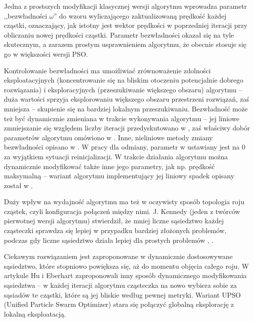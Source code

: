 \documentclass[12pt, twoside, openany, abstract=on]{report}
\theoremstyle{definition}
\begin{document}
Jedna z prostszych modyfikacji klasycznej wersji algorytmu wprowadza parametr ,,bezwładności $\omega$'' do wzoru wyliczającego zaktualizowaną prędkość każdej cząstki, oznaczający, jak istotny jest wektor prędkości w poprzedniej iteracji przy obliczaniu nowej prędkości cząstki. Parametr bezwładności okazał się na tyle skutecznym, a zarazem prostym usprawnieniem algorytmu, że obecnie stosuje się go w większości wersji PSO.

Kontrolowanie bezwładności ma umożliwiać zrównoważenie zdolności eksploatacyjnych (koncentrowanie się na bliskim otoczeniu potencjalnie dobrego rozwiązania) i eksploracyjnych (przeszukiwanie większego obszaru) algorytmu – duża wartości sprzyja eksplorowaniu większego obszaru przestrzeni rozwiązań, zaś mniejsza – skupienie się na bardziej lokalnym przeszukiwaniu. Bezwładność może też być dynamicznie zmieniana w trakcie wykonywania algorytmu – jej liniowe zmniejszanie się względem liczby iteracji przedyskutowano w \cite{ModPsoInertia}, zaś właściwy dobór parametrów algorytmu omówiono w \cite{ParamSelPso}. Inne, nieliniowe metody zmiany bezwładności opisano w \cite{PsoFuzzyInertia}. W pracy \cite{SelfOrgHPso} dla odmiany, parametr w ustawiany jest na $0$ za wyjątkiem sytuacji reinicjalizacji. W trakcie działania algorytmu można dynamicznie modyfikować także inne jego parametry, jak np. prędkość maksymalną – wariant algorytmu implementujący jej liniowy spadek opisany został w \cite{VmaxPso}.

Duży wpływ na wydajność algorytmu ma też w oczywisty sposób topologia roju cząstek, czyli konfiguracja połączeń między nimi. J. Kennedy (jeden z twórców pierwotnej wersji algorytmu) stwierdził, że mniej liczne sąsiedztwo każdej cząsteczki sprawdza się lepiej w przypadku bardziej złożonych problemów, podczas gdy liczne sąsiedztwo działa lepiej dla prostych problemów \cite{TopologyPso}, \cite{PopStructPso}. 

Ciekawym rozwiązaniem jest zaproponowane w \cite{PsoNeighOp} dynamicznie dostosowywane sąsiedztwo, które stopniowo powiększa się, aż do momentu objęcia całego roju. W artykule \cite{MultiobjDynNeighPso} Hu i Eberhart zaproponowali inny sposób dynamicznego modyfikowania sąsiedztwa – w każdej iteracji algorytmu cząsteczka na nowo wybiera sobie za sąsiadów te cząstki, które są jej bliskie według pewnej metryki. Wariant UPSO (Unified Particle Swarm Optimizer) \cite{UPso} stara się połączyć globalną eksplorację z lokalną eksploatacją.
\end{document}
